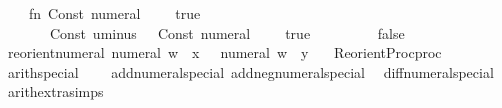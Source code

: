 \begin{isabellebody}
\ \ \ \ {\isacharparenleft}{\kern0pt}fn\ Const\ {\isacharparenleft}{\kern0pt}\isactrlconstUNDERSCOREname {\isasymopen}numeral{\isasymclose}{\isacharcomma}{\kern0pt}\ {\isacharunderscore}{\kern0pt}{\isacharparenright}{\kern0pt}\ {\isachardollar}{\kern0pt}\ {\isacharunderscore}{\kern0pt}\ {\isacharequal}{\kern0pt}{\isachargreater}{\kern0pt}\ true\isanewline
\ \ \ \ \ \ {\isacharbar}{\kern0pt}\ Const\ {\isacharparenleft}{\kern0pt}\isactrlconstUNDERSCOREname {\isasymopen}uminus{\isasymclose}{\isacharcomma}{\kern0pt}\ {\isacharunderscore}{\kern0pt}{\isacharparenright}{\kern0pt}\ {\isachardollar}{\kern0pt}\ {\isacharparenleft}{\kern0pt}Const\ {\isacharparenleft}{\kern0pt}\isactrlconstUNDERSCOREname {\isasymopen}numeral{\isasymclose}{\isacharcomma}{\kern0pt}\ {\isacharunderscore}{\kern0pt}{\isacharparenright}{\kern0pt}\ {\isachardollar}{\kern0pt}\ {\isacharunderscore}{\kern0pt}{\isacharparenright}{\kern0pt}\ {\isacharequal}{\kern0pt}{\isachargreater}{\kern0pt}\ true\isanewline
\ \ \ \ \ \ {\isacharbar}{\kern0pt}\ {\isacharunderscore}{\kern0pt}\ {\isacharequal}{\kern0pt}{\isachargreater}{\kern0pt}\ false{\isacharparenright}{\kern0pt}\isanewline
{\isacartoucheclose}\isanewline
\isanewline
{}\isamarkupfalse%
\ reorient{\isacharunderscore}{\kern0pt}numeral\ {\isacharparenleft}{\kern0pt}{\isachardoublequoteopen}numeral\ w\ {\isacharequal}{\kern0pt}\ x{\isachardoublequoteclose}\ {\isacharbar}{\kern0pt}\ {\isachardoublequoteopen}{\isacharminus}{\kern0pt}\ numeral\ w\ {\isacharequal}{\kern0pt}\ y{\isachardoublequoteclose}{\isacharparenright}{\kern0pt}\ {\isacharequal}{\kern0pt}\isanewline
\ \ Reorient{\isacharunderscore}{\kern0pt}Proc{\isachardot}{\kern0pt}proc%
\endisatagML
{\isafoldML}%
%
\isadelimML
%
\endisadelimML
%
\isadelimdocument
%
\endisadelimdocument
%
\isatagdocument
%
\isamarkuptrue%
%
\endisatagdocument
{\isafolddocument}%
%
\isadelimdocument
%
\endisadelimdocument
{}\isamarkupfalse%
\ arith{\isacharunderscore}{\kern0pt}special\ {\isacharequal}{\kern0pt}\ \isanewline
\ \ add{\isacharunderscore}{\kern0pt}numeral{\isacharunderscore}{\kern0pt}special\ add{\isacharunderscore}{\kern0pt}neg{\isacharunderscore}{\kern0pt}numeral{\isacharunderscore}{\kern0pt}special\isanewline
\ \ diff{\isacharunderscore}{\kern0pt}numeral{\isacharunderscore}{\kern0pt}special\isanewline
\isanewline
{}\isamarkupfalse%
\ arith{\isacharunderscore}{\kern0pt}extra{\isacharunderscore}{\kern0pt}simps\ {\isacharequal}{\kern0pt}\ \isanewline

\end{isabellebody}
